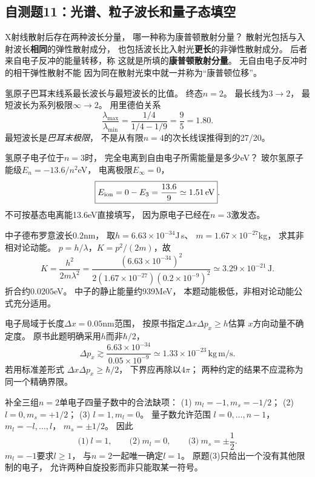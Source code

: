 \subsection{自测题11：光谱、粒子波长和量子态填空}

\problemtext X射线散射后存在两种波长分量，
哪一种称为康普顿散射分量？
\workings
散射光包括与入射波长\textbf{相同}的弹性散射成分，
也包括波长比入射光\textbf{更长}的非弹性散射成分。
后者来自电子反冲的能量转移，称
这就是所填的\textbf{康普顿散射分量}。
\crosscheck 无自由电子反冲时的相干弹性散射不能
因为同在散射光束中就一并称为“康普顿位移”。

\problemtext 氢原子巴耳末线系最长波长与最短波长的比值。
\workings
终态$n=2$。
最长线为$3\to2$，
最短波长为系列极限$\infty\to2$。
用里德伯关系
\[
\boxed{\frac{\lambda_{\max}}{\lambda_{\min}}
=\frac{1/4}{1/4-1/9}
=\frac95=1.80}.
\]
\crosscheck 最短波长是\emph{巴耳末极限}，
不是从有限$n=4$的次长线误推得到的27/20。

\problemtext 氢原子电子位于$n=3$时，
完全电离到自由电子所需能量是多少eV？
\workings
玻尔氢原子能级$E_n=-13.6/n^2$eV，
电离极限$E_\infty=0$，
\[
\boxed{E_{\rm ion}=0-E_3=\frac{13.6}{9}
\simeq1.51\,\mathrm{eV}}.
\]
\crosscheck 不可按基态电离能13.6eV直接填写，
因为原电子已经在$n=3$激发态。

\problemtext 中子德布罗意波长$0.2$nm，
取$h=6.63\times10^{-34}$J\,s、
$m=1.67\times10^{-27}$kg，
求其非相对论动能。
\workings
$p=h/\lambda$，$K=p^2/(2m)$，故
\[
\boxed{K=\frac{h^2}{2m\lambda^2}
=\frac{(6.63\times10^{-34})^2}
{2(1.67\times10^{-27})(0.2\times10^{-9})^2}
\simeq3.29\times10^{-21}\,\mathrm J}.
\]
折合约$0.0205$eV。
\crosscheck 中子的静止能量约939MeV，
本题动能极低，非相对论动能公式充分适用。

\problemtext 电子局域于长度$\Delta x=0.05$nm范围，
按原书指定$\Delta x\Delta p_x\ge h$估算
$x$方向动量不确定度。
\workings
原书此题明确采用$h$而非$\hbar/2$，
\[
\boxed{\Delta p_x\gtrsim
\frac{6.63\times10^{-34}}
{0.05\times10^{-9}}
\simeq1.33\times10^{-23}\,\mathrm{kg\,m/s}}.
\]
\crosscheck 若用标准差形式
$\Delta x\Delta p_x\ge\hbar/2$，
下界应再除以$4\pi$；
两种约定的结果不应混称为同一个精确界限。

\problemtext 补全三组$n=2$单电子四量子数中的合法缺项：
(1) $m_l=-1,m_s=-1/2$；
(2) $l=0,m_s=+1/2$；
(3) $l=1,m_l=0$。
\workings
量子数允许范围
$l=0,\ldots,n-1$，
$m_l=-l,\ldots,l$，
$m_s=\pm1/2$。
因此
\[
\boxed{\text{(1)}\ l=1},\qquad
\boxed{\text{(2)}\ m_l=0},\qquad
\boxed{\text{(3)}\ m_s=\pm\frac12}.
\]
\crosscheck $m_l=-1$要求$l\ge1$，
与$n=2$一起唯一确定$l=1$。
原题(3)只给出一个没有其他限制的电子，
允许两种自旋投影而非只能取某一符号。


